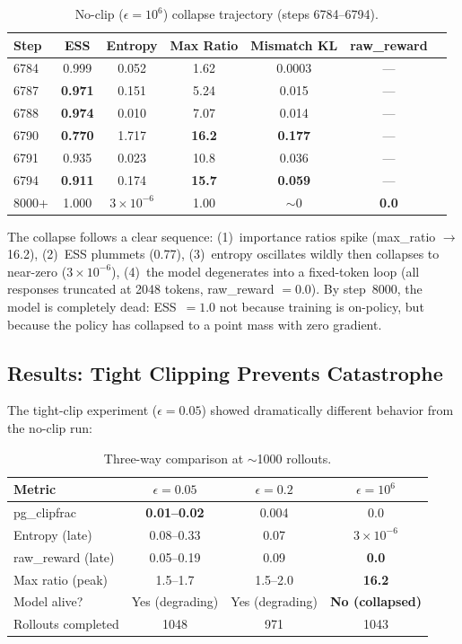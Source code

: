 \documentclass[11pt,a4paper]{article}
\begin{document}
\begin{table}[H]
\centering
\caption{No-clip ($\epsilon = 10^6$) collapse trajectory (steps 6784--6794).}
\label{tab:noclip_collapse}
\begin{tabular}{@{}lcccccc@{}}
\toprule
\textbf{Step} & \textbf{ESS} & \textbf{Entropy} & \textbf{Max Ratio} & \textbf{Mismatch KL} & \textbf{raw\_reward} \\
\midrule
6784 & 0.999 & 0.052  & 1.62  & 0.0003 & --- \\
6787 & \textbf{0.971} & 0.151  & 5.24  & 0.015  & --- \\
6788 & \textbf{0.974} & 0.010  & 7.07  & 0.014  & --- \\
6790 & \textbf{0.770} & 1.717  & \textbf{16.2} & \textbf{0.177} & --- \\
6791 & 0.935 & 0.023  & 10.8  & 0.036  & --- \\
6794 & \textbf{0.911} & 0.174  & \textbf{15.7} & \textbf{0.059} & --- \\
\midrule
8000+ & 1.000 & $3 \times 10^{-6}$ & 1.00 & $\sim$0 & \textbf{0.0} \\
\bottomrule
\end{tabular}
\end{table}

The collapse follows a clear sequence: (1)~importance ratios spike
(max\_ratio $\to$ 16.2), (2)~ESS plummets (0.77), (3)~entropy oscillates wildly
then collapses to near-zero ($3 \times 10^{-6}$), (4)~the model degenerates into
a fixed-token loop (all responses truncated at 2048 tokens, raw\_reward $= 0.0$).
By step~8000, the model is completely dead: ESS~$= 1.0$ not because training is
on-policy, but because the policy has collapsed to a point mass with zero
gradient.

\subsection{Results: Tight Clipping Prevents Catastrophe}

The tight-clip experiment ($\epsilon = 0.05$) showed dramatically different
behavior from the no-clip run:

\begin{table}[H]
\centering
\caption{Three-way comparison at $\sim$1000 rollouts.}
\label{tab:clip_threeway}
\begin{tabular}{@{}lccc@{}}
\toprule
\textbf{Metric} & $\epsilon = 0.05$ & $\epsilon = 0.2$ & $\epsilon = 10^6$ \\
\midrule
pg\_clipfrac        & \textbf{0.01--0.02} & 0.004 & 0.0 \\
Entropy (late)      & 0.08--0.33 & 0.07 & \textbf{$3 \times 10^{-6}$} \\
raw\_reward (late)  & 0.05--0.19 & 0.09 & \textbf{0.0} \\
Max ratio (peak)    & 1.5--1.7 & 1.5--2.0 & \textbf{16.2} \\
Model alive?        & Yes (degrading) & Yes (degrading) & \textbf{No (collapsed)} \\
Rollouts completed  & 1048 & 971 & 1043 \\
\bottomrule
\end{tabular}
\end{table}
\end{document}
